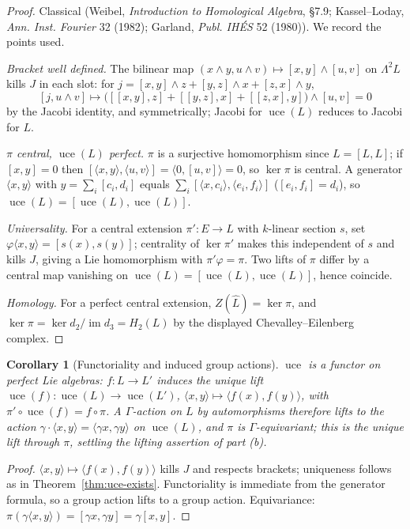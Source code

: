 \documentclass{amsart}
\newtheorem{corollary}{Corollary}
\theoremstyle{definition}
\DeclareMathOperator{\uce}{uce}
\DeclareMathOperator{\im}{im}
\newcommand{\Gm}{\Gamma}
\newcommand{\ra}{\rightarrow}
\begin{document}
\begin{proof}
Classical (Weibel, \emph{Introduction to Homological Algebra}, \S7.9;
Kassel--Loday, \emph{Ann. Inst. Fourier} 32 (1982); Garland, \emph{Publ. IH\'ES} 52
(1980)).  We record the points used.

\emph{Bracket well defined.}  The bilinear map
$(x\wedge y,u\wedge v)\mapsto[x,y]\wedge[u,v]$ on $\Lambda^2L$ kills $J$ in each
slot: for $j=[x,y]\wedge z+[y,z]\wedge x+[z,x]\wedge y$,
\[
   [j,u\wedge v]\mapsto\bigl([[x,y],z]+[[y,z],x]+[[z,x],y]\bigr)\wedge[u,v]=0
\]
by the Jacobi identity, and symmetrically; Jacobi for $\uce(L)$ reduces to Jacobi
for $L$.

\emph{$\pi$ central, $\uce(L)$ perfect.}  $\pi$ is a surjective homomorphism since
$L=[L,L]$; if $[x,y]=0$ then $[\langle x,y\rangle,\langle u,v\rangle]=
\langle0,[u,v]\rangle=0$, so $\ker\pi$ is central.  A generator $\langle
x,y\rangle$ with $y=\sum_i[c_i,d_i]$ equals $\sum_i[\langle x,c_i\rangle,\langle
e_i,f_i\rangle]$ ($[e_i,f_i]=d_i$), so $\uce(L)=[\uce(L),\uce(L)]$.

\emph{Universality.}  For a central extension $\pi'\colon E\ra L$ with $k$-linear
section $s$, set $\varphi\langle x,y\rangle=[s(x),s(y)]$; centrality of $\ker\pi'$
makes this independent of $s$ and kills $J$, giving a Lie homomorphism with
$\pi'\varphi=\pi$.  Two lifts of $\pi$ differ by a central map vanishing on
$\uce(L)=[\uce(L),\uce(L)]$, hence coincide.

\emph{Homology.}  For a perfect central extension, $Z(\widehat L)=\ker\pi$, and
$\ker\pi=\ker d_2/\im d_3=H_2(L)$ by the displayed Chevalley--Eilenberg complex.
\end{proof}

\begin{corollary}[Functoriality and induced group actions]\label{cor:funct}
$\uce$ is a functor on perfect Lie algebras: $f\colon L\ra L'$ induces the unique
lift $\uce(f)\colon\uce(L)\ra\uce(L')$,
$\langle x,y\rangle\mapsto\langle f(x),f(y)\rangle$, with
$\pi'\circ\uce(f)=f\circ\pi$.  A $\Gm$-action on $L$ by automorphisms therefore
lifts to the action $\gamma\cdot\langle x,y\rangle=\langle\gamma x,\gamma
y\rangle$ on $\uce(L)$, and $\pi$ is $\Gm$-equivariant; this is the unique lift
through $\pi$, settling the lifting assertion of part (b).
\end{corollary}
\begin{proof}
$\langle x,y\rangle\mapsto\langle f(x),f(y)\rangle$ kills $J$ and respects
brackets; uniqueness follows as in Theorem~\ref{thm:uce-exists}.  Functoriality is
immediate from the generator formula, so a group action lifts to a group action.
Equivariance: $\pi(\gamma\langle x,y\rangle)=[\gamma x,\gamma y]=\gamma[x,y]$.
\end{proof}
\end{document}
